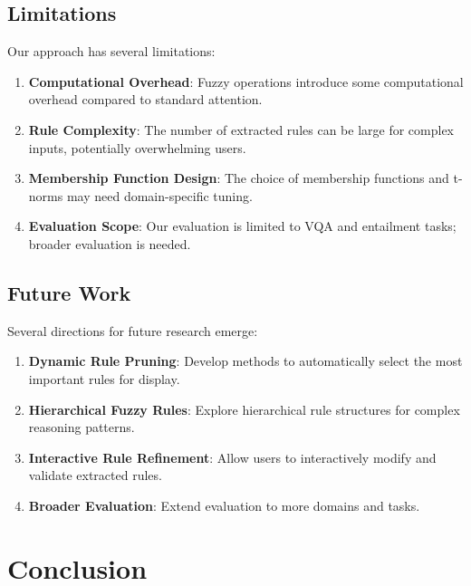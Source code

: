 \documentclass[manuscript,review,anonymous]{acmart}
\begin{document}
\subsection{Limitations}

Our approach has several limitations:

\begin{enumerate}
    \item \textbf{Computational Overhead}: Fuzzy operations introduce some computational overhead compared to standard attention.

    \item \textbf{Rule Complexity}: The number of extracted rules can be large for complex inputs, potentially overwhelming users.

    \item \textbf{Membership Function Design}: The choice of membership functions and t-norms may need domain-specific tuning.

    \item \textbf{Evaluation Scope}: Our evaluation is limited to VQA and entailment tasks; broader evaluation is needed.
\end{enumerate}

\subsection{Future Work}

Several directions for future research emerge:

\begin{enumerate}
    \item \textbf{Dynamic Rule Pruning}: Develop methods to automatically select the most important rules for display.

    \item \textbf{Hierarchical Fuzzy Rules}: Explore hierarchical rule structures for complex reasoning patterns.

    \item \textbf{Interactive Rule Refinement}: Allow users to interactively modify and validate extracted rules.

    \item \textbf{Broader Evaluation}: Extend evaluation to more domains and tasks.
\end{enumerate}

\section{Conclusion}
\end{document}
